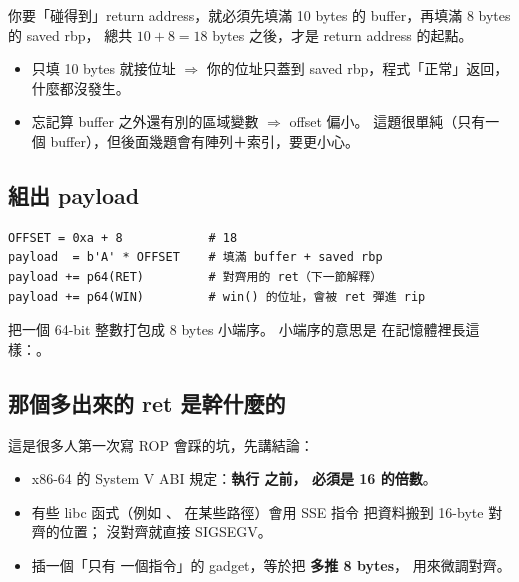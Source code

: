 你要「碰得到」return address，就必須先填滿 10 bytes 的 buffer，再填滿 8 bytes 的 saved rbp，
總共 $10 + 8 = 18$ bytes 之後，才是 return address 的起點。

\begin{warnbox}[最常見的兩個錯]
\begin{itemize}[leftmargin=1.4em,itemsep=1pt]
  \item 只填 10 bytes 就接位址 $\Rightarrow$ 你的位址只蓋到 saved rbp，程式「正常」返回，什麼都沒發生。
  \item 忘記算 buffer 之外還有別的區域變數 $\Rightarrow$ offset 偏小。
        這題很單純（只有一個 buffer），但後面幾題會有陣列＋索引，要更小心。
\end{itemize}
\end{warnbox}

\subsection{組出 payload}

\begin{lstlisting}[style=py]
OFFSET = 0xa + 8            # 18
payload  = b'A' * OFFSET    # 填滿 buffer + saved rbp
payload += p64(RET)         # 對齊用的 ret（下一節解釋）
payload += p64(WIN)         # win() 的位址，會被 ret 彈進 rip
\end{lstlisting}

 把一個 64-bit 整數打包成 8 bytes 小端序。
小端序的意思是  在記憶體裡長這樣：。

\subsection{那個多出來的 ret 是幹什麼的}

這是很多人第一次寫 ROP 會踩的坑，先講結論：

\begin{itemize}[leftmargin=1.4em,itemsep=1pt]
  \item x86-64 的 System V ABI 規定：\textbf{執行  之前， 必須是 16 的倍數}。
  \item 有些 libc 函式（例如 、 在某些路徑）會用 SSE 指令
         把資料搬到 16-byte 對齊的位置； 沒對齊就直接 SIGSEGV。
  \item 插一個「只有  一個指令」的 gadget，等於把  \textbf{多推 8 bytes}，
        用來微調對齊。
\end{itemize}

